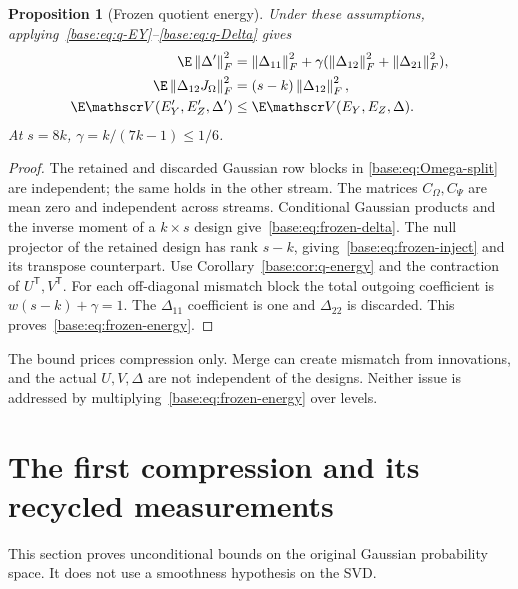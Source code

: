 \documentclass[11pt,oneside,openany,a4paper]{book}
\numberwithin{equation}{chapter}
\newtheorem{proposition}[theorem]{Proposition}
\theoremstyle{definition}
\theoremstyle{remark}
\newcommand{\T}{\mathsf T}\newcommand{\Id}{I}
\newcommand{\F}[1]{\left\lVert#1\right\rVert_F}
\begin{document}
\begin{proposition}[Frozen quotient energy]\label{base:prop:frozen-quotient}
Under these assumptions, applying~\eqref{base:eq:q-EY}--\eqref{base:eq:q-Delta} gives
\begin{align}
 \E\F{\Delta'}^2
   &=\F{\Delta_{11}}^2
       +\gamma(\F{\Delta_{12}}^2+\F{\Delta_{21}}^2),\label{base:eq:frozen-delta}\\
 \E\F{\Delta_{12}J_\Omega}^2&=(s-k)\F{\Delta_{12}}^2,\label{base:eq:frozen-inject}\\
 \E\mathscr V(E_Y',E_Z',\Delta')
   &\le\E\mathscr V(E_Y,E_Z,\Delta).\label{base:eq:frozen-energy}
\end{align}
At $s=8k$, $\gamma=k/(7k-1)\le1/6$.
\end{proposition}
\begin{proof}
The retained and discarded Gaussian row blocks in
\eqref{base:eq:Omega-split} are independent; the same holds in the other stream.
The matrices $C_\Omega,C_\Psi$ are mean zero and independent across streams.
Conditional Gaussian products and the inverse moment of a $k\times s$
design give~\eqref{base:eq:frozen-delta}. The null projector of the retained
design has rank $s-k$, giving~\eqref{base:eq:frozen-inject} and its transpose
counterpart. Use Corollary~\ref{base:cor:q-energy} and the contraction of
$U^{\T},V^{\T}$. For each off-diagonal mismatch block the total outgoing
coefficient is $w(s-k)+\gamma=1$. The $\Delta_{11}$ coefficient is one and
$\Delta_{22}$ is discarded. This proves~\eqref{base:eq:frozen-energy}.\end{proof}

The bound prices compression only. Merge can create mismatch from
innovations, and the actual $U,V,\Delta$ are not independent of the designs.
Neither issue is addressed by multiplying~\eqref{base:eq:frozen-energy} over
levels.

\section{The first compression and its recycled measurements}\label{base:sec:finite}
This section proves unconditional bounds on the original Gaussian
probability space. It does not use a smoothness hypothesis on the SVD.
\end{document}
